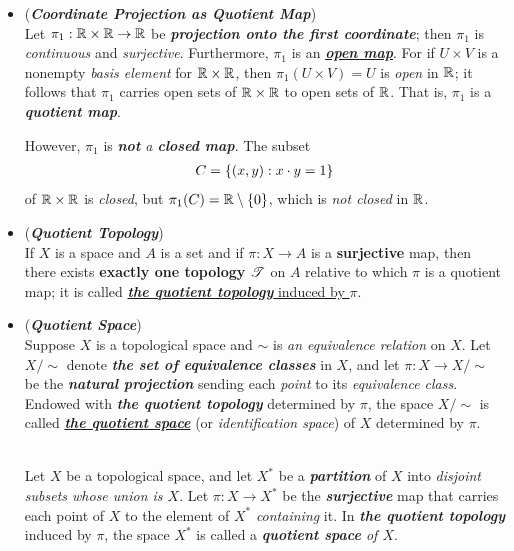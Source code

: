 \documentclass[11pt]{article}
\begin{document}
\begin{itemize}
\item \begin{example} (\emph{\textbf{Coordinate Projection as Quotient Map}})\\
Let $\pi_1 : {\mathbb R} \times {\mathbb R} \rightarrow {\mathbb R}$ be \emph{\textbf{projection onto the first coordinate}}; then $\pi_1$ is \emph{continuous} and \emph{surjective}. Furthermore, $\pi_1$ is an \underline{\emph{\textbf{open map}}}. For if $U \times V$ is a nonempty \emph{basis element} for ${\mathbb R} \times {\mathbb R}$, then $\pi_1(U \times V) = U$ is \emph{open} in ${\mathbb R}$; it follows that $\pi_1$ carries open sets of ${\mathbb R} \times {\mathbb R}$ to open sets of ${\mathbb R}$. That is, $\pi_1$ is a \emph{\textbf{quotient map}}.

However, $\pi_1$ is \emph{\textbf{not} a \textbf{closed map}}. The subset
\begin{align*}
C = \left\{(x, y): x \cdot y =1\right\}
\end{align*}
of ${\mathbb R} \times {\mathbb R}$ is \emph{closed}, but $\pi_1(C) = {\mathbb R} \setminus \{0\}$, which is \emph{not closed} in ${\mathbb R}$.
\end{example}

\item \begin{definition} (\emph{\textbf{Quotient Topology}})\\
If $X$ is a space and $A$ is a set and if $\pi: X \rightarrow A$ is a \textbf{surjective} map, then there exists \textbf{exactly one topology} ${\mathscr T}$ on $A$ relative to which $\pi$ is a quotient map; it is called \underline{\emph{\textbf{the quotient topology}} induced by $\pi$}.
\end{definition}

\item \begin{definition}(\emph{\textbf{Quotient Space}})\\
Suppose $X$ is a topological space and $\sim$ is \emph{an equivalence relation} on $X$. Let $X/\sim$ denote \emph{\textbf{the set of equivalence classes}} in $X$, and let $\pi: X \rightarrow X/\sim$ be the \emph{\textbf{natural projection}} sending each \emph{point} to its \emph{equivalence class}. Endowed with \emph{\textbf{the quotient topology}} determined by $\pi$, the space $X/\sim$ is called \underline{\emph{\textbf{the quotient space}}} (or \emph{identification space}) of $X$ determined by $\pi$.
\end{definition}

\begin{definition} \citep{munkres2000topology}\\
Let $X$ be a topological space, and let $X^{*}$ be a \emph{\textbf{partition}} of $X$ into \emph{disjoint subsets whose union is $X$}. Let $\pi: X \rightarrow X^*$ be the \emph{\textbf{surjective}} map that carries each point of $X$ to the element of $X^*$ \emph{containing} it. In \emph{\textbf{the quotient topology}} induced by $\pi$, the space $X^*$ is called a \emph{\textbf{quotient space} of $X$}.
\end{definition}


\end{itemize}
\end{document}
